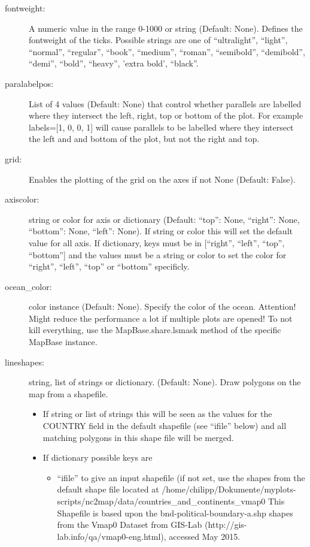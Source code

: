 \begin{description}
    \item[\gls*{fontweight}:] \label{item:fontweight}  A numeric value in the range 0-1000 or string (Default: None). Defines the fontweight of the ticks. Possible strings are one of \enquote{ultralight}, \enquote{light}, \enquote{normal}, \enquote{regular}, \enquote{book}, \enquote{medium}, \enquote{roman}, \enquote{semibold}, \enquote{demibold}, \enquote{demi}, \enquote{bold}, \enquote{heavy}, 'extra bold', \enquote{black}.
    \item[\gls*{paralabelpos}:] \label{item:paralabelpos}  List of 4 values (Default: None) that control whether parallels are labelled where they intersect the left, right, top or bottom of the plot. For example labels=[1, 0, 0, 1] will cause parallels to be labelled where they intersect the left and and bottom of the plot, but not the right and top.
    \item[\gls*{grid}:] \label{item:grid}  Enables the plotting of the grid on the axes if not None (Default: False).
    \item[\gls*{axiscolor}:] \label{item:axiscolor}  string or color for axis or dictionary (Default: {\enquote{top}: None, \enquote{right}: None, \enquote{bottom}: None, \enquote{left}: None}). If string or color this will set the default value for all axis. If dictionary, keys must be in [\enquote{right}, \enquote{left}, \enquote{top}, \enquote{bottom}] and the values must be a string or color to set the color for \enquote{right}, \enquote{left}, \enquote{top} or \enquote{bottom} specificly.
    \item[\gls*{ocean_color}:] \label{item:ocean_color}  color instance (Default: None). Specify the color of the ocean. Attention! Might reduce the performance a lot if multiple plots are opened! To not kill everything, use the MapBase.share.lsmask method of the specific MapBase instance.
    \item[\gls*{lineshapes}:] \label{item:lineshapes}  string, list of strings or dictionary. (Default: None). Draw polygons on the map from a shapefile.
\begin{itemize}
    \item If string or list of strings this will be seen as the values for the COUNTRY field in the default shapefile (see \enquote{ifile} below) and all matching polygons in this shape file will be merged.
    \item If dictionary possible keys are
\begin{itemize}
        \item \enquote{ifile} to give an input shapefile (if not set, use the shapes from the default shape file located at /home/chilipp/Dokumente/myplots-scripts/nc2map/data/countries\_and\_continents\_vmap0 This Shapefile is based upon the bnd-political-boundary-a.shp shapes from the Vmap0 Dataset from GIS-Lab (http://gis-lab.info/qa/vmap0-eng.html), accessed May 2015.

\end{itemize}
\end{itemize}
\end{description}
